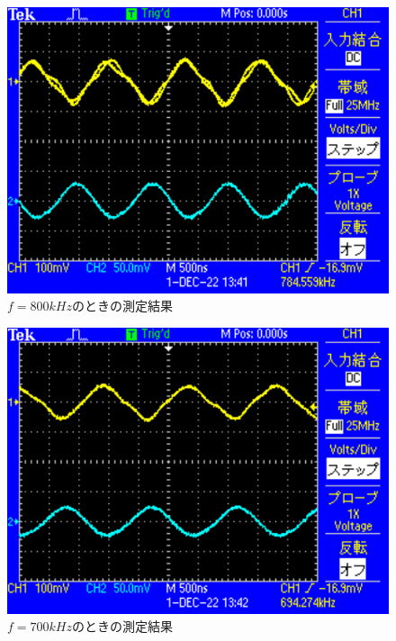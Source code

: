 \begin{figure}[H]
    \centering
    \includegraphics[scale=0.5]{TEK0003.pdf}
    \caption{$f=800\si{kHz}$のときの測定結果}
\end{figure}

\begin{figure}[H]
    \centering
    \includegraphics[scale=0.5]{TEK0004.pdf}
    \caption{$f=700\si{kHz}$のときの測定結果}
\end{figure}


